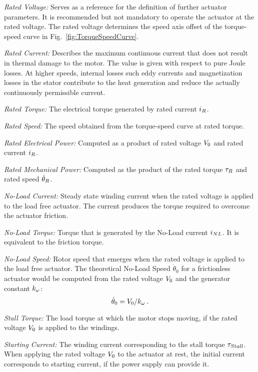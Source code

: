 \documentclass[a4paper,10pt]{cjtdsheet}      %
\begin{document}
\begin{multicols}{2}
\emph{Rated Voltage:} Serves as a reference for the definition of further actuator parameters. It is recommended but not mandatory to operate the actuator at the rated voltage. The rated voltage determines the speed axis offset of the torque-speed curve in Fig.~\ref{fig:TorqueSpeedCurve}. 

\emph{Rated Current:} Describes the maximum continuous current that does not result in thermal damage to the motor. The value is given with respect to pure Joule losses. At higher speeds, internal losses such eddy currents and magnetization losses in the stator contribute to the heat generation and reduce the actually continuously permissible current.

\emph{Rated Torque:} The electrical torque generated by rated current $i_R$.

\emph{Rated Speed:} The speed obtained from the torque-speed curve at rated torque. 

\emph{Rated Electrical Power:} Computed as a product of rated voltage $V_0$ and rated current $i_R$.

\emph{Rated Mechanical Power:} Computed as the product of the rated torque $\tau_R$ and rated speed $\dot{\theta}_R$.

\emph{No-Load Current:} Steady state winding current when the rated voltage is applied to the load free actuator. The current produces the torque required to overcome the actuator friction.

\emph{No-Load Torque:} Torque that is generated by the No-Load current $i_{NL}$. It is equivalent to the friction torque.

\emph{No-Load Speed:} Rotor speed that emerges when the rated voltage is applied to the load free actuator. The theoretical No-Load Speed $\dot{\theta}_0$ for a frictionless actuator would be computed from the rated voltage $V_0$ and the generator constant $k_\omega$:
\begin{equation}
	\dot{\theta}_0 = V_0 / k_\omega\:.
\end{equation}

\emph{Stall Torque:} The load torque at which the motor stops moving, if the rated voltage $V_0$ is applied to the windings.

\emph{Starting Current:} The winding current corresponding to the stall torque $\tau_{Stall}$. When applying the rated voltage $V_0$ to the actuator at rest, the initial current corresponds to starting current, if the power supply can provide it.


\end{multicols}
\end{document}
